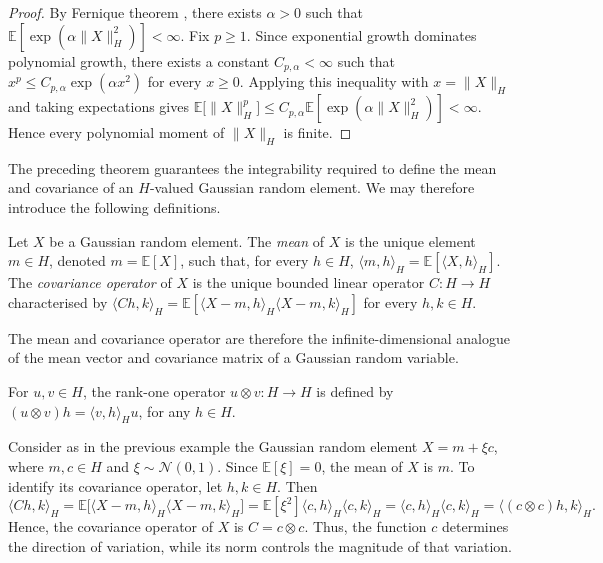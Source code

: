 \begin{proof}
By Fernique theorem \parencite[Theorem 2.8.5.]{Bogachev1998}, there exists \(\alpha>0\) such that \(\mathbb E\left[\exp\left(\alpha\|X\|_H^2\right)\right]<\infty\). Fix \(p\geqslant1\). Since exponential growth dominates polynomial growth, there exists a constant \(C_{p,\alpha}<\infty\) such that \(x^p\leqslant C_{p,\alpha}\exp(\alpha x^2)\) for every \(x\geqslant0\). Applying this inequality with \(x=\|X\|_H\) and taking expectations gives \(\mathbb E\bigl[\|X\|_H^p\bigr]\leqslant C_{p,\alpha}\mathbb E\left[\exp\left(\alpha\|X\|_H^2\right)\right]<\infty\). Hence every polynomial moment of \(\|X\|_H\) is finite.
\end{proof}

The preceding theorem guarantees the integrability required to define the mean and covariance of an \(H\)-valued Gaussian random element. We may therefore introduce the following definitions.

\begin{definition}
Let \(X\) be a Gaussian random element. The \emph{mean} of \(X\) is the unique element \(m\in H\), denoted \(m=\mathbb E[X]\), such that, for every \(h\in H\), \(\langle m,h\rangle_H=\mathbb E[\langle X,h\rangle_H]\). The \emph{covariance operator} of \(X\) is the unique bounded linear operator \(C:H\to H\) characterised by \(\langle Ch,k\rangle_H=\mathbb E[\langle X-m,h\rangle_H\langle X-m,k\rangle_H]\) for every \(h,k\in H\).
\end{definition}

The mean and covariance operator are therefore the infinite-dimensional analogue of the mean vector and covariance matrix of a Gaussian random variable.

\begin{definition}
For \(u,v\in H\), the rank-one operator \(u\otimes v:H\to H\) is defined by \(
(u\otimes v)h=\langle v,h\rangle_Hu\), for any \(h\in H\).
\end{definition}

\begin{example}[]
Consider as in the previous example the Gaussian random element \(X=m+\xi c\), where \(m,c\in H\) and \(\xi\sim\mathcal N(0,1)\). Since \(\mathbb E[\xi]=0\), the mean of \(X\) is \(m\). To identify its covariance operator, let \(h,k\in H\). Then
\[
\langle Ch,k\rangle_H=\mathbb E\bigl[\langle X-m,h\rangle_H\langle X-m,k\rangle_H\bigr]=\mathbb E[\xi^2]\langle c,h\rangle_H\langle c,k\rangle_H=\langle c,h\rangle_H\langle c,k\rangle_H = \langle (c\otimes c)h,k\rangle_H.
\]
Hence, the covariance operator of \(X\) is \(C=c\otimes c\). Thus, the function \(c\) determines the direction of variation, while its norm controls the magnitude of that variation.
\end{example}

